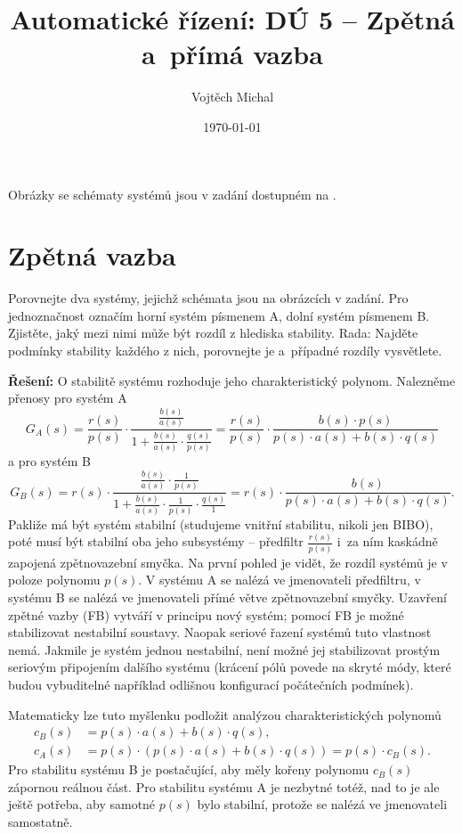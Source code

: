 \documentclass[twoside]{article}
\title{Automatické řízení: DÚ 5 -- Zpětná a~přímá vazba}
\author{Vojtěch Michal}
\date{\today}
\begin{document}
\maketitle

Obrázky se schématy systémů jsou v zadání dostupném na \cite{zadani}.

\section{Zpětná vazba}
Porovnejte dva systémy, jejichž schémata jsou na obrázcích v zadání.
Pro jednoznačnost označím horní systém písmenem A, dolní systém písmenem B.
Zjistěte, jaký mezi nimi může být rozdíl z hlediska stability. Rada: Najděte podmínky stability každého
z nich, porovnejte je a~případné rozdíly vysvětlete.

\textbf{Řešení:}
O stabilitě systému rozhoduje jeho charakteristický polynom. Nalezněme přenosy pro systém A
\begin{equation}
	G_A(s) = \frac{r(s)}{p(s)} \cdot \frac{\frac{b(s)}{a(s)} }{1 + \frac{b(s)}{a(s)} \cdot \frac{q(s)}{p(s)}} =
	\frac{r(s)}{p(s)} \cdot \frac{b(s) \cdot p(s)}{p(s) \cdot a(s) + b(s) \cdot q(s)}
\end{equation}
a pro systém B
\begin{equation}
	G_B(s) = r(s) \cdot \frac{\frac{b(s)}{a(s)} \cdot \frac{1}{p(s)}}{1 + \frac{b(s)}{a(s)} \cdot \frac{1}{p(s)} \cdot \frac{q(s)}{1}} =
	r(s) \cdot \frac{b(s) }{p(s) \cdot a(s) + b(s) \cdot q(s)}.
\end{equation}
Pakliže má být systém stabilní (studujeme vnitřní stabilitu, nikoli jen BIBO), poté musí být stabilní oba jeho subsystémy -- předfiltr
$\frac{r(s)}{p(s)}$ i~za ním kaskádně zapojená zpětnovazební smyčka. Na první pohled je vidět, že rozdíl systémů je v poloze
polynomu $p(s)$. V systému A se nalézá ve jmenovateli předfiltru, v systému B se nalézá ve jmenovateli přímé větve zpětnovazební
smyčky. Uzavření zpětné vazby (FB) vytváří v principu nový systém; pomocí FB je možné stabilizovat nestabilní soustavy.
Naopak seriové řazení systémů tuto vlastnost nemá. Jakmile je systém jednou nestabilní, není možné jej stabilizovat prostým 
seriovým připojením dalšího systému (krácení pólů povede na skryté módy, které budou vybuditelné například odlišnou konfigurací
počátečních podmínek).

Matematicky lze tuto myšlenku podložit analýzou charakteristických polynomů
\begin{equation}
	\begin{split}
		c_B(s) &= p(s) \cdot a(s) + b(s) \cdot q(s), \\
		c_A(s) &= p(s) \cdot (p(s) \cdot a(s) + b(s) \cdot q(s)) = p(s) \cdot c_B(s).
	\end{split}
\end{equation}
Pro stabilitu systému B je postačující, aby měly kořeny polynomu $c_B(s)$ zápornou reálnou část.
Pro stabilitu systému A je nezbytné totéž, nad to je ale ještě potřeba, aby samotné $p(s)$ bylo stabilní,
protože se nalézá ve jmenovateli samostatně.
\end{document}
